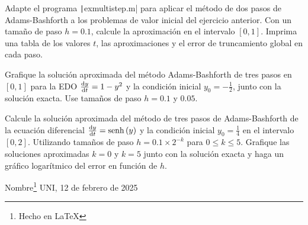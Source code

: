 \begin{questions}

    \question

    Adapte el programa \texttt|exmultistep.m| para aplicar
    el método de dos pasos de Adams-Bashforth a los problemas de
    valor inicial del ejercicio anterior.
    Con un tamaño de paso $h=0.1$, calcule la aproximación en el
    intervalo $\left[0,1\right]$.
    Imprima una tabla de los valores $t$, las aproximaciones y el
    error de truncamiento global en cada paso.

    \question

    Grafique la solución aproximada del método Adams-Bashforth de
    tres pasos en $\left[0,1\right]$ para la EDO $\diff{y}{t}=1-y^{2}$
    y la condición inicial $y_{0}=-\frac{1}{2}$, junto con la solución exacta.
    Use tamaños de paso $h=0.1$ y $0.05$.

    \question

    Calcule la solución aproximada del método de tres pasos de
    Adams-Bashforth de la ecuación diferencial
    $\diff{y}{t}=\operatorname{senh}\left(y\right)$ y la condición
    inicial $y_{0}=\frac{1}{4}$ en el intervalo $\left[0, 2\right]$.
    Utilizando tamaños de paso $h=0.1\times 2^{-k}$ para $0\leq k\leq 5$.
    Grafique las soluciones aproximadas $k=0$ y $k=5$ junto con la
    solución exacta y haga un gráfico logarítmico del error en función de $h$.
\end{questions}

\providecommand{\name}{Nombre}
\vfill{Nombre}\footnote{Hecho en \LaTeX}
\hfill{UNI, 12 de febrero de 2025}

